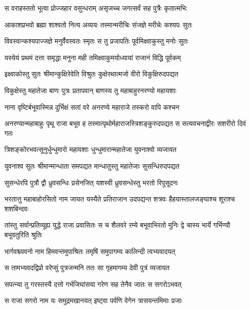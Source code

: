 \twolineshloka
{स वराहस्ततो भूत्वा प्रोज्जहार वसुन्धराम्}
{असृजच्च जगत्सर्वं सह पुत्रैः कृतात्मभिः} %

\twolineshloka
{आकाशप्रभवो ब्रह्मा शाश्वतो नित्य अव्ययः}
{तस्मान्मरीचिः संजज्ञे मरीचेः कश्यपः सुतः} %

\twolineshloka
{विवस्वान्कश्यपाज्जज्ञे मनुर्वैवस्वतः स्मृतः}
{स तु प्रजापतिः पूर्वमिक्ष्वाकुस्तु मनोः सुतः} %

\twolineshloka
{यस्येयं प्रथमं दत्ता समृद्धा मनुना मही}
{तमिक्ष्वाकुमयोध्यायां राजानं विद्धि पूर्वकम्} %

\twolineshloka
{इक्ष्वाकोस्तु सुतः श्रीमान्कुक्षिरेवेति विश्रुतः}
{कुक्षेरथात्मजो वीरो विकुक्षिरुदपद्यत} %

\twolineshloka
{विकुक्षेस्तु महातेजा बाणः पुत्रः प्रतापवान्}
{बाणस्य तु महाबाहुरनरण्यो महायशाः} %

\twolineshloka
{नाना वृष्टिर्बभूवास्मिन्न दुर्भिक्षं सतां वरे}
{अनरण्ये महाराजे तस्करो वापि कश्चन} %

\threelineshloka
{अनरण्यान्महाबाहुः पृथू राजा बभूव ह}
{तस्मात्पृथोर्महाराजस्त्रिशङ्कुरुदपद्यत}
{स सत्यवचनाद्वीरः सशरीरो दिवं गतः} %

\twolineshloka
{त्रिशङ्कोरभवत्सूनुर्धुन्धुमारो महायशाः}
{धुन्धुमारान्महातेजा युवनाश्वो व्यजायत} %

\twolineshloka
{युवनाश्व सुतः श्रीमान्मान्धाता समपद्यत}
{मान्धातुस्तु महातेजाः सुसन्धिरुदपद्यत} %

\twolineshloka
{सुसन्धेरपि पुत्रौ द्वौ ध्रुवसन्धिः प्रसेनजित्}
{यशस्वी ध्रुवसन्धेस्तु भरतो रिपुसूदनः} %

\threelineshloka
{भरतात्तु महाबाहोरसितो नाम जायत}
{यस्यैते प्रतिराजान उदपद्यन्त शत्रवः}
{हैहयास्तालजङ्घाश्च शूराश्च शशबिन्दवः} %

\threelineshloka
{तांस्तु सर्वान्प्रतिव्यूह्य युद्धे राजा प्रवासितः}
{स च शैलवरे रम्ये बभूवाभिरतो मुनिः}
{द्वे चास्य भार्ये गर्भिण्यौ बभूवतुरिति श्रुतिः} %

\twolineshloka
{भार्गवश्च्यवनो नाम हिमवन्तमुपाश्रितः}
{तमृषिं समुपागम्य कालिन्दी त्वभ्यवादयत्} %

\twolineshloka
{स तामभ्यवदद्विप्रो वरेप्सुं पुत्रजन्मनि}
{ततः सा गृहमागम्य देवी पुत्रं व्यजायत} %

\twolineshloka
{सपत्न्या तु गरस्तस्यै दत्तो गर्भजिघांसया}
{गरेण सह तेनैव जातः स सगरोऽभवत्} %

\twolineshloka
{स राजा सगरो नाम यः समुद्रमखानयत्}
{इष्ट्वा पर्वणि वेगेन त्रासयन्तमिमाः प्रजाः} %

